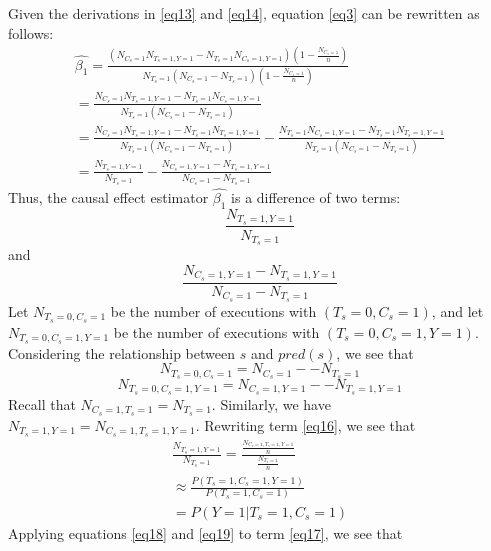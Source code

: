 Given the derivations in \eqref{eq13} and \eqref{eq14}, equation \eqref{eq3} can be rewritten as follows:
\begin{equation}\label{eq15}
\begin{array}{l}
\widehat {\beta _1}=\frac{(N_{C_s=1}N_{T_s=1,Y=1}-N_{T_s=1}N_{C_s=1,Y=1})(1-\frac{N_{C_s=1}}{n})}{N_{T_s=1}(N_{C_s=1}-N_{T_s=1})(1-\frac{N_{C_s=1}}{n})}\\
=\frac{N_{C_s=1}N_{T_s=1,Y=1}-N_{T_s=1}N_{C_s=1,Y=1}}{N_{T_s=1}(N_{C_s=1}-N_{T_s=1})}\\
=\frac{N_{C_s=1}N_{T_s=1,Y=1}-N_{T_s=1}N_{T_s=1,Y=1}}{N_{T_s=1}(N_{C_s=1}-N_{T_s=1})}
-\frac{N_{T_s=1}N_{C_s=1,Y=1}-N_{T_s=1}N_{T_s=1,Y=1}}{N_{T_s=1}(N_{C_s=1}-N_{T_s=1})}\\
=\frac{N_{T_s=1,Y=1}}{N_{T_s=1}}-\frac{N_{C_s=1,Y=1}-N_{T_s=1,Y=1}}{N_{C_s=1}-N_{T_s=1}}
\end{array}
\end{equation}
Thus, the causal effect estimator $\widehat{\beta_1}$ is a difference of two terms:
\begin{equation}\label{eq16}
\frac{N_{T_s=1,Y=1}}{N_{T_s=1}}
\end{equation}
and
\begin{equation}\label{eq17}
\frac{N_{C_s=1,Y=1}-N_{T_s=1,Y=1}}{N_{C_s=1}-N_{T_s=1}}
\end{equation}
Let $N_{T_s=0,C_s=1}$ be the number of executions with $(T_s=0,C_s=1)$, and let $N_{T_s=0,C_s=1,Y=1}$ be the number of executions with $(T_s=0,C_s=1,Y=1)$.  Considering the relationship between $s$ and $pred(s)$, we see that
\begin{equation}\label{eq18}
N_{T_s=0,C_s=1}=N_{C_s=1}--N_{T_s=1}
\end{equation}
\begin{equation}\label{eq19}
N_{T_s=0,C_s=1,Y=1}=N_{C_s=1,Y=1}--N_{T_s=1,Y=1}
\end{equation}
Recall that $N_{C_s=1,T_s=1}=N_{T_s=1}$. Similarly, we have $N_{T_s=1,Y=1}=N_{C_s=1,T_s=1,Y=1}$.  Rewriting term \eqref{eq16}, we see that
\begin{equation}\label{eq20}
\begin{array}{l}
\frac{N_{T_s=1,Y=1}}{N_{T_s=1}}=\frac{\frac{N_{C_s=1,T_s=1,Y=1}}{n}}{\frac{N_{T_s=1}}{n}}\\
\approx \frac{P(T_s=1,C_s=1,Y=1)}{P(T_s=1,C_s=1)}\\
=P(Y=1|T_s=1,C_s=1)
\end{array}
\end{equation}
Applying equations \eqref{eq18} and \eqref{eq19} to term \eqref{eq17}, we see that
